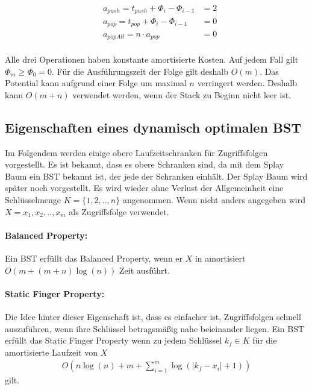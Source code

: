 \documentclass[a4paper,12pt]{article}
\begin{document}
\begin{align*}   
&a_{\mathit{push}} = t_{\mathit{push}} + \Phi_{i} - \Phi_{i-1}  &= 2\\
&a_{\mathit{pop}} = t_{\mathit{pop}} + \Phi_{i} - \Phi_{i-1}  &= 0\\
&a_{\mathit{popAll}} = n \cdot a_{\mathit{pop}} &= 0
\end{align*}\\
Alle drei Operationen haben konstante amortisierte Kosten. Auf jedem Fall gilt $ \Phi_m \geq  \Phi_0 = 0 $. Für die Ausführungszeit der Folge gilt deshalb $O(m)$. Das Potential kann aufgrund einer Folge um maximal $n$ verringert werden. Deshalb kann $O\left(m + n\right)$ verwendet werden, wenn der Stack zu Beginn nicht leer ist.  \\



\subsection{Eigenschaften eines dynamisch optimalen BST }\label{upperBounds}
Im Folgendem werden einige obere Laufzeitschranken für Zugriffsfolgen vorgestellt. Es ist bekannt, dass es obere Schranken sind, da mit dem Splay Baum ein BST bekannt ist, der jede der Schranken einhält. Der Splay Baum wird später noch vorgestellt. Es wird wieder ohne Verlust der Allgemeinheit eine Schlüsselmenge $K = \{1,2,..,n\}$ angenommen. Wenn nicht anders angegeben wird  $X = x_1,x_2,..,x_m$ als Zugriffsfolge verwendet. 


\paragraph{Balanced Property:}
Ein BST erfüllt das Balanced Property, wenn er $X$ in amortisiert $O\left(m + \left(m + n\right) \log \left( n\right)  \right)$ Zeit ausführt. 

\paragraph{Static Finger Property:}
Die Idee hinter dieser Eigenschaft ist, dass es einfacher ist, Zugriffsfolgen schnell auszuführen, wenn ihre Schlüssel betragsmäßig nahe beieinander liegen. Ein BST erfüllt das Static Finger Property wenn zu jedem Schlüssel $k_f \in K$ für die amortisierte Laufzeit von $X$ 
\begin{align*}
O\left( n \log\left( n\right) +m + \sum_{i = 1}^{m} \log \left( \vert k_f - x_i  \vert	+ 1	\right)\right)
\end{align*}
gilt. 
\end{document}
